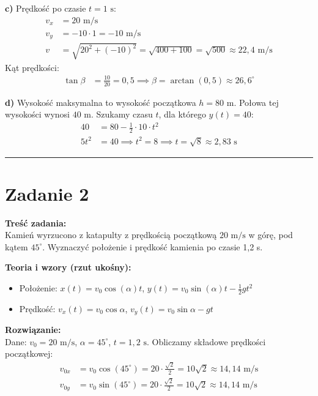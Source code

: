 \documentclass[11pt, a4paper]{article}
\begin{document}
\textbf{c)} Prędkość po czasie $t = 1 \text{ s}$:
\begin{align*}
    v_x &= 20 \text{ m/s} \\
    v_y &= -10 \cdot 1 = -10 \text{ m/s} \\
    v &= \sqrt{20^2 + (-10)^2} = \sqrt{400 + 100} = \sqrt{500} \approx 22,4 \text{ m/s}
\end{align*}
Kąt prędkości:
\begin{align*}
    \tan\beta &= \frac{10}{20} = 0,5 \implies \beta = \arctan(0,5) \approx 26,6^\circ
\end{align*}

\textbf{d)} Wysokość maksymalna to wysokość początkowa $h=80 \text{ m}$. Połowa tej wysokości wynosi $40 \text{ m}$. Szukamy czasu $t$, dla którego $y(t) = 40$:
\begin{align*}
    40 &= 80 - \frac{1}{2} \cdot 10 \cdot t^2 \\
    5t^2 &= 40 \implies t^2 = 8 \implies t = \sqrt{8} \approx 2,83 \text{ s}
\end{align*}

\vspace{0.5cm}
\hrule
\vspace{0.5cm}

\section*{Zadanie 2}

\textbf{Treść zadania:} \\
Kamień wyrzucono z katapulty z prędkością początkową $20 \text{ m/s}$ w górę, pod kątem $45^\circ$. Wyznaczyć położenie i prędkość kamienia po czasie 1,2 s.

\textbf{Teoria i wzory (rzut ukośny):}
\begin{itemize}
    \item Położenie: $x(t) = v_0 \cos(\alpha) t$, \quad $y(t) = v_0 \sin(\alpha) t - \frac{1}{2}gt^2$
    \item Prędkość: $v_x(t) = v_0 \cos\alpha$, \quad $v_y(t) = v_0 \sin\alpha - gt$
\end{itemize}

\textbf{Rozwiązanie:} \\
Dane: $v_0 = 20 \text{ m/s}$, $\alpha = 45^\circ$, $t = 1,2 \text{ s}$. Obliczamy składowe prędkości początkowej:
\begin{align*}
    v_{0x} &= v_0 \cos(45^\circ) = 20 \cdot \frac{\sqrt{2}}{2} = 10\sqrt{2} \approx 14,14 \text{ m/s} \\
    v_{0y} &= v_0 \sin(45^\circ) = 20 \cdot \frac{\sqrt{2}}{2} = 10\sqrt{2} \approx 14,14 \text{ m/s}
\end{align*}
\end{document}
